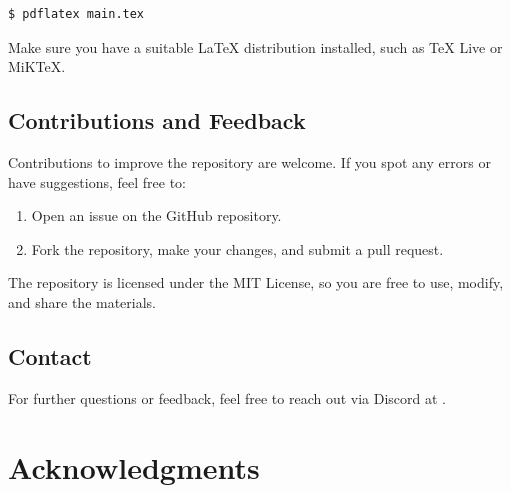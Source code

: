 \documentclass{article}
\begin{document}
\begin{tcolorbox}[terminal]
\begin{verbatim}
$ pdflatex main.tex
\end{verbatim}
\end{tcolorbox}


Make sure you have a suitable \LaTeX{} distribution installed, such as TeX Live or MiKTeX.

\subsection*{Contributions and Feedback}

Contributions to improve the repository are welcome. If you spot any errors or have suggestions, feel free to:
\begin{enumerate}
    \item Open an issue on the GitHub repository.
    \item Fork the repository, make your changes, and submit a pull request.
\end{enumerate}

The repository is licensed under the MIT License, so you are free to use, modify, and share the materials.  

\subsection*{Contact}

For further questions or feedback, feel free to reach out via Discord at  \! .

\section*{Acknowledgments}
\end{document}
